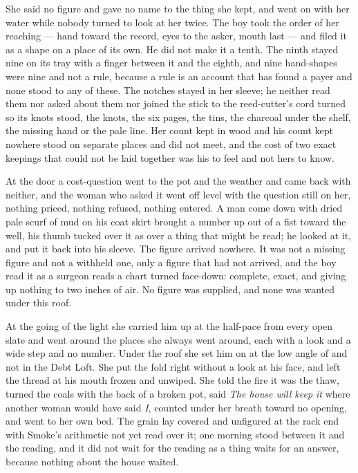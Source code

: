 She said no figure and gave no name to the thing she kept, and went on with her water while nobody turned to look at her twice. The boy took the order of her reaching --- hand toward the record, eyes to the asker, mouth last --- and filed it as a shape on a place of its own. He did not make it a tenth. The ninth stayed nine on its tray with a finger between it and the eighth, and nine hand-shapes were nine and not a rule, because a rule is an account that has found a payer and none stood to any of these. The notches stayed in her sleeve; he neither read them nor asked about them nor joined the stick to the reed-cutter's cord turned so its knots stood, the knots, the six pages, the tins, the charcoal under the shelf, the missing hand or the pale line. Her count kept in wood and his count kept nowhere stood on separate places and did not meet, and the cost of two exact keepings that could not be laid together was his to feel and not hers to know.

\scenebreak

At the door a cost-question went to the pot and the weather and came back with neither, and the woman who asked it went off level with the question still on her, nothing priced, nothing refused, nothing entered. A man come down  with dried pale scurf of mud on his coat skirt brought a number up out of a fist toward the well, his thumb tucked over it as over a thing that might be read; he looked at it, and put it back into his sleeve. The figure arrived nowhere. It was not a missing figure and not a withheld one, only a figure that had not arrived, and the boy read it as a surgeon reads a chart turned face-down: complete, exact, and giving up nothing to two inches of air. No figure was supplied, and none was wanted under this roof.

At the going of the light she carried him up at the half-pace from every open slate and went around the places she always went around, each with a look and a wide step and no number. Under the roof she set him on  at the low angle of  and not in the Debt Loft. She put the fold right without a look at his face, and left the thread at his mouth frozen and unwiped. She told the fire it was the thaw, turned the coals with the back of a broken pot, said \emph{The house will keep it} where another woman would have said \emph{I}, counted under her breath toward no opening, and went to her own bed. The grain lay covered and unfigured at the rack end with Smoke's arithmetic not yet read over it; one morning stood between it and the reading, and it did not wait for the reading as a thing waits for an answer, because nothing about the house waited.

